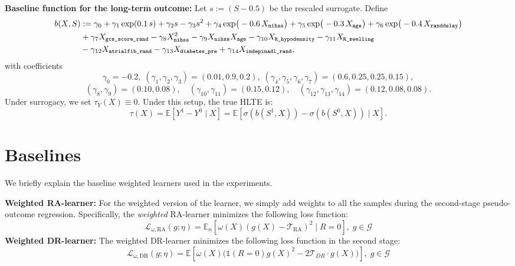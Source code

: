 \documentclass{article}
\theoremstyle{plain}
\theoremstyle{definition}
\theoremstyle{remark}
\newcommand{\E}{\mathbb{E}}                %
\newcommand{\1}{\mathds{1}}                %
\begin{document}
\textbf{Baseline function for the long-term outcome:}
Let $s := (S- 0.5)$ be the rescaled surrogate. Define
\begin{align}
b(X,S)
&:= \gamma_0
+ \gamma_1 \exp(0.1\,s)
+ \gamma_2 s
- \gamma_3 s^2
+ \gamma_4 \exp\!\big(-0.6\,X_{\texttt{nihss}}\big)
+ \gamma_5 \exp\!\big(-0.3\,X_{\texttt{age}}\big)
+ \gamma_6 \exp\!\big(-0.4\,X_{\texttt{randdelay}}\big) \notag \\
&+ \gamma_7 X_{\texttt{gcs\_score\_rand}}
- \gamma_8 X_{\texttt{nihss}}^2
- \gamma_9 X_{\texttt{nihss}}X_{\texttt{age}}
- \gamma_{10} X_{\texttt{R\_hypodensity}}
- \gamma_{11} X_{\texttt{R\_swelling}} \notag \\
& - \gamma_{12} X_{\texttt{atrialfib\_rand}} 
- \gamma_{13} X_{\texttt{diabetes\_pre}}
+ \gamma_{14} X_{\texttt{indepinadl\_rand}},
\end{align}
with coefficients
\[
\gamma_0=-0.2,\;
(\gamma_1,\gamma_2,\gamma_3)=(0.01,0.9,0.2),\;
(\gamma_4,\gamma_5,\gamma_6,\gamma_7)=(0.6,0.25,0.25,0.15),
\]
\[
(\gamma_8,\gamma_9)=(0.10,0.08),\quad
(\gamma_{10},\gamma_{11})=(0.15,0.12),\quad
(\gamma_{12},\gamma_{13},\gamma_{14})=(0.12,0.08,0.08).
\]
Under surrogacy, we set $\tau_Y(X)\equiv 0$. Under this setup, the true HLTE is:
\begin{equation}
    \tau(X)
    = \E[Y^1 - Y^0 \mid X]
    =\E[\sigma(b(S^1,X))- \sigma(b(S^0,X))\mid X].
\end{equation}




\newpage
\section{Baselines}
\label{app:baselines}
We briefly explain the baseline weighted learners used in the experiments.

\textbf{Weighted RA-learner:} For the weighted version of the learner, we simply add weights to all the samples during the second-stage pseudo-outcome regression. Specifically, the \textit{weighted} RA-learner minimizes the following loss function:
    \begin{equation}
        \mathcal{L}_\mathrm{\omega,RA}(g;\eta)=\E_n\left[\omega(X)(g(X)-\mathcal{T}_\mathrm{RA})^2\mid R=0\right], \; g \in \mathcal{G}
    \end{equation}
\textbf{Weighted DR-learner:} The weighted DR-learner minimizes the following loss function in the second stage:
\begin{equation}
        \mathcal{L}_\mathrm{\omega,DR}(g;\eta)=\mathbb{E} \left[ \omega(X)\bigl(\1(R=0)g(X)^2 -2\mathcal{T}_{DR}\cdot g(X)\bigr)\right], \; g \in \mathcal{G}
\end{equation}
\end{document}
